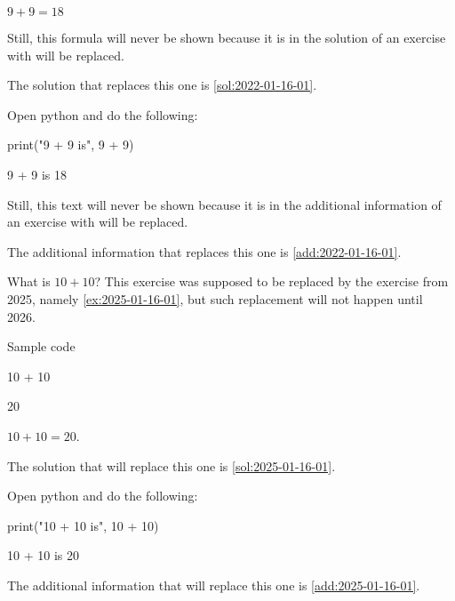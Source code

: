 \documentclass{book}
\begin{document}
\begin{solution}
  \(9 + 9 = 18\)

Still, this formula will never be shown because it is in the solution of an exercise with will be replaced.

The solution that replaces this one is \cref{sol:2022-01-16-01}.
\end{solution}

\begin{additionalinformation}
Open python and do the following:

\begin{pycell}
print("9 + 9 is", 9 + 9)
\end{pycell}
\begin{pyexpectedoutput}
9 + 9 is 18
\end{pyexpectedoutput}

Still, this text will never be shown because it is in the additional information of an exercise with will be replaced.

The additional information that replaces this one is \cref{add:2022-01-16-01}.
\end{additionalinformation}

\begin{exercise}[examdate={January 16, 2024}, examproblemnumber={1}, examproblemid={2024-01-16-01}, replacedbyexamproblemid={2023-01-16-01}, replacementsinceacademicyear={2026/2027}]
  What is \(10 + 10\)? This exercise was supposed to be replaced by the exercise from 2025, namely \cref{ex:2025-01-16-01}, but such replacement will not happen until 2026.

Sample code
\begin{pycell}
10 + 10
\end{pycell}
\begin{pyexpectedoutput}
20
\end{pyexpectedoutput}
\end{exercise}

\begin{solution}
  \(10 + 10 = 20\).

  The solution that will replace this one is \cref{sol:2025-01-16-01}.
\end{solution}

\begin{additionalinformation}
Open python and do the following:

\begin{pycell}
print("10 + 10 is", 10 + 10)
\end{pycell}
\begin{pyexpectedoutput}
10 + 10 is 20
\end{pyexpectedoutput}

The additional information that will replace this one is \cref{add:2025-01-16-01}.
\end{additionalinformation}
\end{document}
